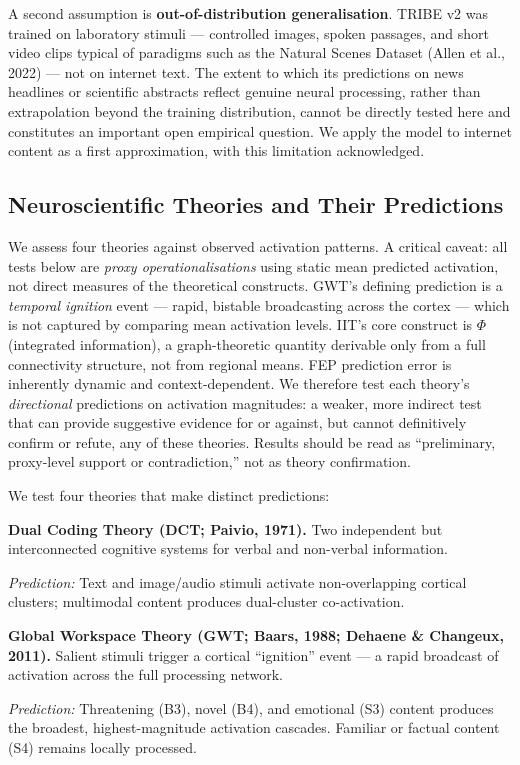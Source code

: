 \documentclass[11pt,letterpaper]{article}
\begin{document}
A second assumption is \textbf{out-of-distribution generalisation}. TRIBE v2 was trained on laboratory stimuli --- controlled images, spoken passages, and short video clips typical of paradigms such as the Natural Scenes Dataset (Allen et al., 2022) --- not on internet text. The extent to which its predictions on news headlines or scientific abstracts reflect genuine neural processing, rather than extrapolation beyond the training distribution, cannot be directly tested here and constitutes an important open empirical question. We apply the model to internet content as a first approximation, with this limitation acknowledged.

\subsection{Neuroscientific Theories and Their Predictions}

We assess four theories against observed activation patterns. A critical caveat: all tests below are \emph{proxy operationalisations} using static mean predicted activation, not direct measures of the theoretical constructs. GWT's defining prediction is a \emph{temporal ignition} event --- rapid, bistable broadcasting across the cortex --- which is not captured by comparing mean activation levels. IIT's core construct is $\Phi$ (integrated information), a graph-theoretic quantity derivable only from a full connectivity structure, not from regional means. FEP prediction error is inherently dynamic and context-dependent. We therefore test each theory's \emph{directional} predictions on activation magnitudes: a weaker, more indirect test that can provide suggestive evidence for or against, but cannot definitively confirm or refute, any of these theories. Results should be read as ``preliminary, proxy-level support or contradiction,'' not as theory confirmation.

We test four theories that make distinct predictions:

\begin{quotebox}
\textbf{Dual Coding Theory (DCT; Paivio, 1971).} Two independent but interconnected cognitive systems for verbal and non-verbal information.\par
\textit{Prediction:} Text and image/audio stimuli activate non-overlapping cortical clusters; multimodal content produces dual-cluster co-activation.
\end{quotebox}

\begin{quotebox}
\textbf{Global Workspace Theory (GWT; Baars, 1988; Dehaene \& Changeux, 2011).} Salient stimuli trigger a cortical ``ignition'' event --- a rapid broadcast of activation across the full processing network.\par
\textit{Prediction:} Threatening (B3), novel (B4), and emotional (S3) content produces the broadest, highest-magnitude activation cascades. Familiar or factual content (S4) remains locally processed.
\end{quotebox}
\end{document}
